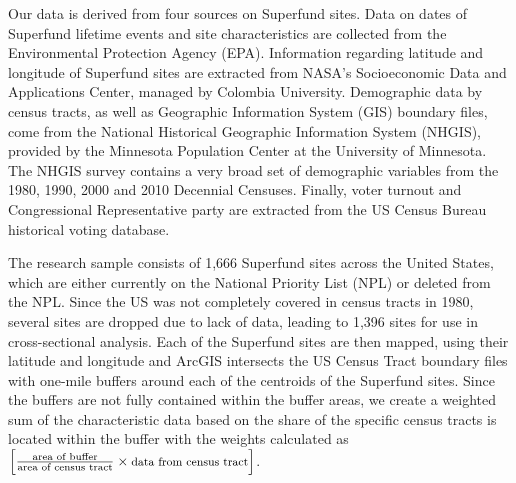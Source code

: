 \documentclass[12pt]{article}
\begin{document}
Our data is derived from four sources on Superfund sites. Data on dates of Superfund lifetime events and site characteristics are collected from the Environmental Protection Agency (EPA). Information regarding latitude and longitude of Superfund sites are extracted from NASA's Socioeconomic Data and Applications Center, managed by Colombia University. Demographic data by census tracts, as well as Geographic Information System (GIS) boundary files, come from the National Historical Geographic Information System (NHGIS), provided by the Minnesota Population Center at the University of Minnesota. The NHGIS survey contains a very broad set of demographic variables from the 1980, 1990, 2000 and 2010 Decennial Censuses. Finally, voter turnout and Congressional Representative party are extracted from the US Census Bureau historical voting database. 

The research sample consists of 1,666 Superfund sites across the United States, which are either currently on the National Priority List (NPL) or deleted from the NPL. Since the US was not completely covered in census tracts in 1980, several sites are dropped due to lack of data, leading to 1,396 sites for use in cross-sectional analysis. Each of the Superfund sites are then mapped, using their latitude and longitude and ArcGIS intersects the US Census Tract boundary files with one-mile buffers around each of the centroids of the Superfund sites. Since the buffers are not fully contained within the buffer areas, we create a weighted sum of the characteristic data based on the share of the specific census tracts is located within the buffer with the weights calculated as $\Big[\frac{\text {area of buffer}}{\text {area of census tract}}\times \text {\footnotesize data from census tract}\Big]$. 
\end{document}

